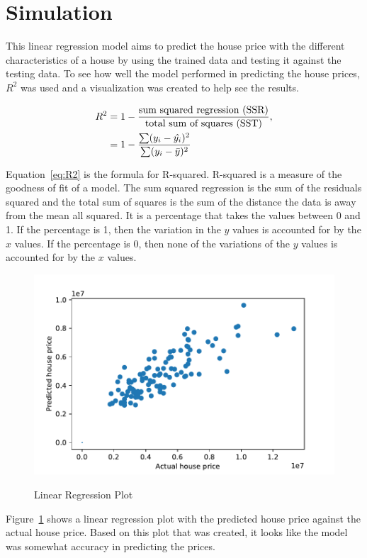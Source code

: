 \documentclass[12pt]{article}
\begin{document}
\section{Simulation}
\label{sec:sim}


This linear regression model aims to predict the house price with the different characteristics of a house by using the trained data and testing it against the testing data. To see how well the model performed in predicting the house prices, \(R^2\) was used and a visualization was created to help see the results.  

\begin{align}
\label{eq:R2}
\begin{split}
    R^2 &= 1 - \frac{\text{sum squared regression (SSR)}}{\text{total sum of squares (SST)}}, \\
    &= 1-\frac{\sum(y_i - \hat{y_i})^2 }{\sum(y_i - \Bar{y})^2} 
\end{split}
\end{align}

Equation~\ref{eq:R2} is the formula for R-squared. R-squared is a measure of the goodness of fit of a model. The sum squared regression is the sum of the residuals squared and the total sum of squares is the sum of the distance the data is away from the mean all squared. It is a percentage that takes the values between 0 and 1. If the percentage is 1, then the variation in the \(y\) values is accounted for by the \(x\) values. If the percentage is 0, then none of the variations of the \(y\) values is accounted for by the \(x\) values. \cite{kasuya2018}

\begin{figure}[h!]
    \caption{Linear Regression Plot}
    \includegraphics[width=1\textwidth]{linear_regression_plot.pdf}
    \label{fig:regression_plot}
\end{figure}
Figure~\ref{fig:regression_plot} shows a linear regression plot with the predicted house price against the actual house price. Based on this plot that was created, it looks like the model was somewhat accuracy in predicting the prices. 
\end{document}

